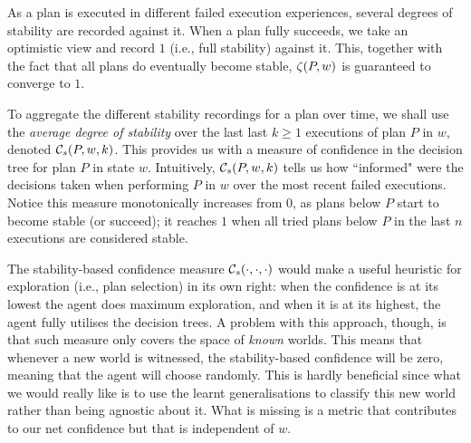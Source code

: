 As a plan is executed in different failed execution experiences, several degrees of stability are recorded against it. When a plan fully succeeds, we take an optimistic view and record $1$ (i.e., full stability) against it. This, together with the fact that all plans do eventually become stable, $\zeta(P,w)$ is guaranteed to converge to $1$. 


To aggregate the different stability recordings for a plan over time, we shall use the \emph{average degree of stability} over the last last $k \geq 1$ executions of plan $P$ in $w$, denoted ${\mathcal{C}}_s(P,w,k)$. 
This provides us with a measure of confidence in the decision tree for plan $P$ in state $w$. Intuitively, ${\mathcal{C}}_s(P,w,k)$ tells us how ``informed" were the decisions taken when performing $P$ in $w$ over the most recent failed executions.
Notice this measure monotonically increases from $0$, as plans below $P$ start to become stable (or succeed); it reaches $1$ when all tried plans below $P$ in the last $n$ executions are considered stable. 


% 
% 
% 
% 
% 


The stability-based confidence measure ${\mathcal{C}}_s(\cdot,\cdot,\cdot)$ would make a useful heuristic for exploration (i.e., plan selection) in its own right: when the confidence is at its lowest the agent does maximum exploration, and when it is at its highest, the agent fully utilises the decision trees. 
A problem with this approach, though, is that such measure only covers the space of \emph{known} worlds. This means that whenever a new world is witnessed, the stability-based confidence will be zero, meaning that the agent will choose randomly. This is hardly beneficial since what we would really like is to use the learnt generalisations to classify this new world rather than being agnostic about it. 
What is missing is a metric that contributes to our net confidence but that is independent of $w$.


